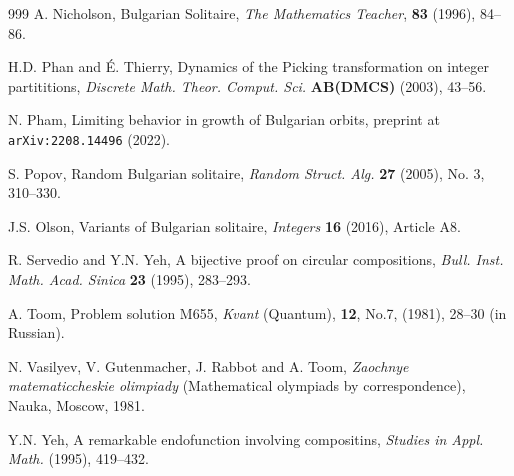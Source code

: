 \documentclass[oneside,12pt]{amsart}
\theoremstyle{definition}
\numberwithin{equation}{section}
\begin{document}
\begin{thebibliography}{999}
 A. Nicholson, Bulgarian Solitaire, 
{\it The Mathematics Teacher}, {\bf 83} (1996), 84--86.

 H.D. Phan and \'{E}. Thierry, Dynamics of the Picking 
transformation on integer partititions, {\it Discrete Math. Theor. Comput.
Sci.} {\bf AB(DMCS)} (2003), 43--56.

 N. Pham, Limiting behavior in growth of Bulgarian orbits,
preprint at {\tt arXiv:2208.14496} (2022).

 S. Popov, Random Bulgarian solitaire, {\it Random  Struct.
Alg.} {\bf 27} (2005), No. 3, 310--330.


 J.S. Olson, Variants of Bulgarian solitaire, 
{\it Integers} {\bf 16} (2016), Article A8.


 R. Servedio and Y.N. Yeh, A bijective proof on circular 
compositions, {\it Bull. Inst. Math. Acad. Sinica} {\bf 23} (1995),
283--293.


 A. Toom, Problem solution M655, {\it Kvant} (Quantum), 
{\bf 12}, No.7,  (1981), 28--30 (in Russian). 


 N. Vasilyev, V. Gutenmacher, J. Rabbot and A. Toom,
{\it Zaochnye matematiccheskie olimpiady} (Mathematical olympiads
by correspondence), Nauka, Moscow, 1981. 

 Y.N. Yeh, A remarkable endofunction involving compositins,
{\it Studies in Appl. Math.} (1995), 419--432.
     
 \end{thebibliography}
\end{document}
